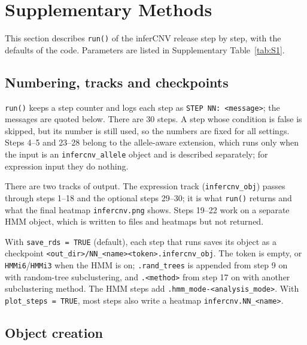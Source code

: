 \section{Supplementary Methods}\label{sec:supplementary_methods}

\providecommand{\sq}{\textquotesingle}

\begingroup
\let\usorig\_
\renewcommand{\_}{\usorig\allowbreak}
\setlength{\emergencystretch}{3em}

This section describes \texttt{run()} of the inferCNV release step by step, with the defaults of the code. Parameters are listed in Supplementary Table~\ref{tab:S1}.

\subsection*{Numbering, tracks and checkpoints}

\texttt{run()} keeps a step counter and logs each step as \texttt{STEP NN: <message>}; the messages are quoted below. There are 30 steps. A step whose condition is false is skipped, but its number is still used, so the numbers are fixed for all settings. Steps 4--5 and 23--28 belong to the allele-aware extension, which runs only when the input is an \texttt{infercnv\_allele} object and is described separately; for expression input they do nothing.

There are two tracks of output. The expression track (\texttt{infercnv\_obj}) passes through steps 1--18 and the optional steps 29--30; it is what \texttt{run()} returns and what the final heatmap \texttt{infercnv.png} shows. Steps 19--22 work on a separate HMM object, which is written to files and heatmaps but not returned.

With \texttt{save\_rds\ =\ TRUE} (default), each step that runs saves its object as a checkpoint \texttt{<out\_dir>/\allowbreak NN\_<name><token>.infercnv\_obj}. The token is empty, or \texttt{HMMi6}/\texttt{HMMi3} when the HMM is on; \texttt{.rand\_trees} is appended from step 9 on with random-tree subclustering, and \texttt{.<method>} from step 17 on with another subclustering method. The HMM steps add \texttt{.hmm\_mode-<analysis\_mode>}. With \texttt{plot\_steps\ =\ TRUE}, most steps also write a heatmap \texttt{infercnv.NN\_<name>}.

\subsection*{Object creation}

